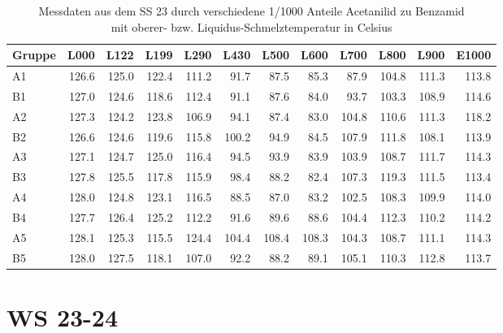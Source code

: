 \begin{table}[h]
\centering \begin{tabular}{lrrrrrrrrrrr}
\toprule
Gruppe & L000 & L122 & L199 & L290 & L430 & L500 & L600 & L700 & L800 & L900 & E1000 \\
\midrule
A1 & 126.6 & 125.0 & 122.4 & 111.2 & 91.7 & 87.5 & 85.3 & 87.9 & 104.8 & 111.3 & 113.8 \\
B1 & 127.0 & 124.6 & 118.6 & 112.4 & 91.1 & 87.6 & 84.0 & 93.7 & 103.3 & 108.9 & 114.6 \\
A2 & 127.3 & 124.2 & 123.8 & 106.9 & 94.1 & 87.4 & 83.0 & 104.8 & 110.6 & 111.3 & 118.2 \\
B2 & 126.6 & 124.6 & 119.6 & 115.8 & 100.2 & 94.9 & 84.5 & 107.9 & 111.8 & 108.1 & 113.9 \\
A3 & 127.1 & 124.7 & 125.0 & 116.4 & 94.5 & 93.9 & 83.9 & 103.9 & 108.7 & 111.7 & 114.3 \\
B3 & 127.8 & 125.5 & 117.8 & 115.9 & 98.4 & 88.2 & 82.4 & 107.3 & 119.3 & 111.5 & 113.4 \\
A4 & 128.0 & 124.8 & 123.1 & 116.5 & 88.5 & 87.0 & 83.2 & 102.5 & 108.3 & 109.9 & 114.0 \\
B4 & 127.7 & 126.4 & 125.2 & 112.2 & 91.6 & 89.6 & 88.6 & 104.4 & 112.3 & 110.2 & 114.2 \\
A5 & 128.1 & 125.3 & 115.5 & 124.4 & 104.4 & 108.4 & 108.3 & 104.3 & 108.7 & 111.1 & 114.3 \\
B5 & 128.0 & 127.5 & 118.1 & 107.0 & 92.2 & 88.2 & 89.1 & 105.1 & 110.3 & 112.8 & 113.7 \\
\bottomrule
\end{tabular}
\caption{Messdaten aus dem SS 23 durch verschiedene 1/1000 Anteile Acetanilid zu Benzamid\\mit oberer- bzw. Liquidus-Schmelztemperatur in Celsius}
\end{table}
\newpage\section*{WS 23-24}
